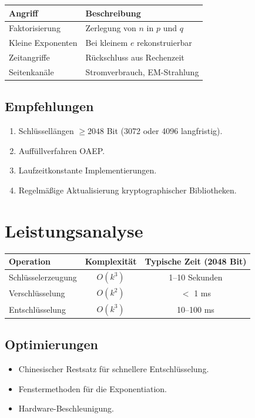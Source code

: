 \begin{center}
\begin{tabular}{ll}
\toprule
Angriff & Beschreibung \\
\midrule
Faktorisierung & Zerlegung von $n$ in $p$ und $q$ \\
Kleine Exponenten & Bei kleinem $e$ rekonstruierbar \\
Zeitangriffe & Rückschluss aus Rechenzeit \\
Seitenkanäle & Stromverbrauch, EM-Strahlung \\
\bottomrule
\end{tabular}
\end{center}

\subsection{Empfehlungen}

\begin{enumerate}
  \item Schlüssellängen $\ge 2048$ Bit (3072 oder 4096 langfristig).
  \item Auffüllverfahren OAEP.
  \item Laufzeitkonstante Implementierungen.
  \item Regelmäßige Aktualisierung kryptographischer Bibliotheken.
\end{enumerate}

\section{Leistungsanalyse}

\begin{center}
\begin{tabular}{lcc}
\toprule
Operation & Komplexität & Typische Zeit (2048 Bit) \\
\midrule
Schlüsselerzeugung & $O(k^3)$ & 1--10 Sekunden \\
Verschlüsselung & $O(k^2)$ & $<$ 1 ms \\
Entschlüsselung & $O(k^3)$ & 10--100 ms \\
\bottomrule
\end{tabular}
\end{center}

\subsection{Optimierungen}

\begin{itemize}
  \item Chinesischer Restsatz für schnellere Entschlüsselung.
  \item Fenstermethoden für die Exponentiation.
  \item Hardware-Beschleunigung.
\end{itemize}

